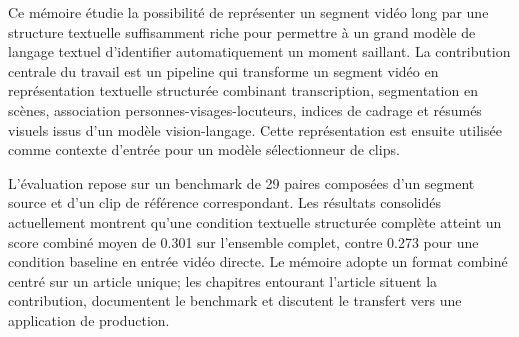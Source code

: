 Ce m\'emoire \'etudie la possibilit\'e de repr\'esenter un segment vid\'eo long par une structure textuelle suffisamment riche pour permettre \`a un grand mod\`ele de langage textuel d'identifier automatiquement un moment saillant. La contribution centrale du travail est un pipeline qui transforme un segment vid\'eo en repr\'esentation textuelle structur\'ee combinant transcription, segmentation en sc\`enes, association personnes-visages-locuteurs, indices de cadrage et r\'esum\'es visuels issus d'un mod\`ele vision-langage. Cette repr\'esentation est ensuite utilis\'ee comme contexte d'entr\'ee pour un mod\`ele s\'electionneur de clips.

L'\'evaluation repose sur un benchmark de 29 paires compos\'ees d'un segment source et d'un clip de r\'ef\'erence correspondant. Les r\'esultats consolid\'es actuellement montrent qu'une condition textuelle structur\'ee compl\`ete atteint un score combin\'e moyen de 0.301 sur l'ensemble complet, contre 0.273 pour une condition baseline en entr\'ee vid\'eo directe. Le m\'emoire adopte un format combin\'e centr\'e sur un article unique; les chapitres entourant l'article situent la contribution, documentent le benchmark et discutent le transfert vers une application de production.
